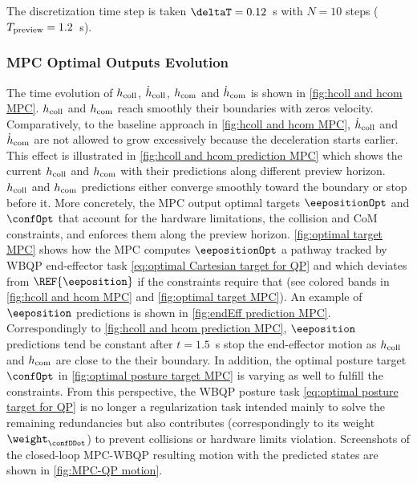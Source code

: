 The discretization time step is taken $\deltaT = 0.12$~s with $N=10$ steps ($T_{\rm preview}=1.2$~s).
\subsubsection{MPC Optimal Outputs Evolution}
The time evolution of $h_{\rm coll}$, $\dot{h}_{\rm coll}$, $h_{\rm com}$ and $\dot{h}_{\rm com}$ is shown in \cref{fig:hcoll and hcom MPC}. $h_{\rm coll}$ and $h_{\rm com}$ reach smoothly their boundaries with zeros velocity. Comparatively, to the baseline approach in \cref{fig:hcoll and hcom MPC}, $\dot{h}_{\rm coll}$ and $\dot{h}_{\rm com}$ are not allowed to grow excessively because the deceleration starts earlier. This effect is illustrated in   \cref{fig:hcoll and hcom  prediction MPC} which shows the current $h_{\rm coll}$ and $h_{\rm com}$ with their predictions along different preview horizon. $h_{\rm coll}$ and $h_{\rm com}$ predictions either converge smoothly  toward the boundary  or stop before it. 
More concretely, the MPC output optimal targets $\eepositionOpt$  and $\confOpt$ that account for the hardware limitations, the collision and CoM constraints, and enforces them along the preview horizon. \cref{fig:optimal target MPC} shows how the MPC  computes $\eepositionOpt$ a pathway tracked by WBQP end-effector task \cref{eq:optimal Cartesian target for QP} and which deviates from $\REF{\eeposition}$ if the constraints require that (see colored bands in \cref{fig:hcoll and hcom MPC} and \cref{fig:optimal target MPC}). An example of $\eeposition$ predictions is shown in \cref{fig:endEff prediction MPC}. Correspondingly to \cref{fig:hcoll and hcom  prediction MPC},  $\eeposition$ predictions tend be constant after $t=1.5$~s stop the end-effector motion as $h_{\rm coll}$ and $h_{\rm com}$ are close to the their boundary.
In addition, the optimal posture target $\confOpt$ in \cref{fig:optimal posture target MPC} is varying as well to fulfill the constraints. From this perspective, the WBQP posture task \cref{eq:optimal posture target for QP} is no longer a regularization task intended mainly to solve the remaining redundancies but also contributes (correspondingly to its weight $\weight_{\confDDot}$) to prevent collisions or hardware limits violation. Screenshots of the closed-loop MPC-WBQP resulting motion with the predicted states are shown in \cref{fig:MPC-QP motion}.


